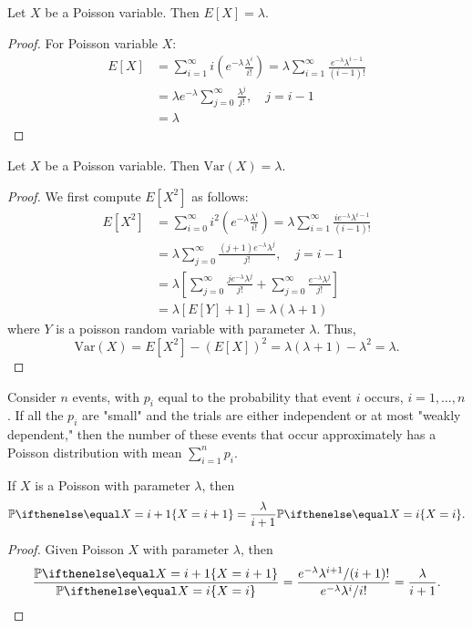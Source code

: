 \documentclass[a4paper,8pt]{article}
\begin{document}
\begin{outline}
    Let \(X\) be a Poisson variable. Then \(E[X] = \lambda\).

    \begin{proof}
      For Poisson variable \(X\):
      \begin{align*}
        E[X] &= \sum_{i=1}^{\infty}i\left(e^{-\lambda}\frac{\lambda^i}{i!}\right)
             = \lambda\sum_{i=1}^{\infty}\frac{e^{-\lambda}\lambda^{i-1}}{(i-1)!} \\
             &= \lambda e^{-\lambda}\sum_{j=0}^{\infty}\frac{\lambda^j}{j!},\quad j=i-1 \\
             &= \lambda
      \end{align*}
    \end{proof}

    Let \(X\) be a Poisson variable. Then \(\text{Var}(X) = \lambda\).

    \begin{proof}
      We first compute \(E[X^2]\) as follows:
      \begin{align*}
        E[X^2] &= \sum_{i=0}^{\infty}i^2\left(e^{-\lambda}\frac{\lambda^i}{i!}\right)
                = \lambda\sum_{i=1}^{\infty}\frac{ie^{-\lambda}\lambda^{i-1}}{(i-1)!} \\
               &= \lambda\sum_{j=0}^{\infty}\frac{(j+1)e^{-\lambda}\lambda^j}{j!},\quad j=i-1 \\
               &= \lambda\left[\sum_{j=0}^{\infty}\frac{je^{-\lambda}\lambda^j}{j!} +
                  \sum_{j=0}^{\infty}\frac{e^{-\lambda}\lambda^j}{j!}\right] \\
               &= \lambda\left[E[Y] + 1\right]
                = \lambda(\lambda + 1)
      \end{align*}
      where \(Y\) is a poisson random variable with parameter \(\lambda\). Thus,
      \[\text{Var}(X) = E[X^2] - (E[X])^2 = \lambda(\lambda+1) - \lambda^2 = \lambda\text{.}\]
    \end{proof}

    Consider \(n\) events, with \(p_i\) equal to the probability that event \(i\) occurs, \(i=1,\ldots,n\).
    If all the \(p_i\) are "small" and the trials are either independent or at most "weakly dependent,"
    then the number of these events that occur approximately has a Poisson distribution with mean \(\sum_{i=1}^np_i\).

    If \(X\) is a Poisson with parameter \(\lambda\), then \[ \bbp[X=i+1] = \frac{\lambda}{i+1}\bbp[X=i]\text{.} \]

    \begin{proof}
      Given Poisson \(X\) with parameter \(\lambda\), then
      \[
        \frac{\bbp[X=i+1]}{\bbp[X=i]}
        = \frac{e^{-\lambda}\lambda^{i+1}/(i+1)!}{e^{-\lambda}\lambda^i/i!}
        = \frac{\lambda}{i+1}\text{.}
      \]
    \end{proof}

\end{outline}
\end{document}
